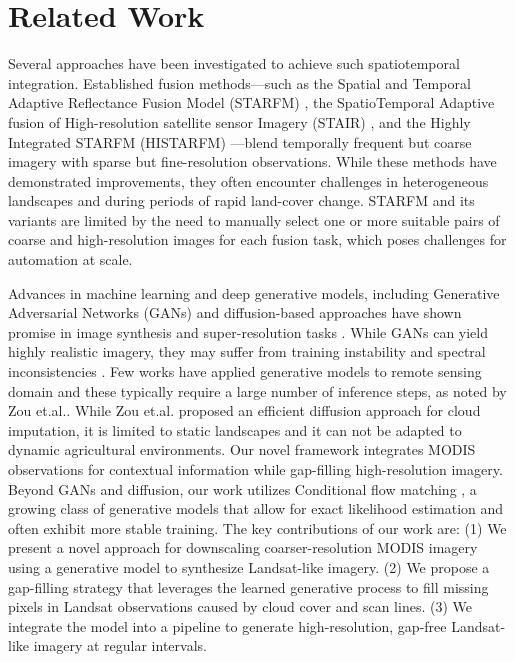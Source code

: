 \section{Related Work}
Several approaches have been investigated to achieve such spatiotemporal integration. Established fusion methods—such as the 
Spatial and Temporal Adaptive Reflectance Fusion Model (STARFM) \cite{gao2006starfm}, the SpatioTemporal Adaptive fusion 
of High-resolution satellite sensor Imagery (STAIR) \cite{zhu2010fusion}, and the Highly Integrated STARFM (HISTARFM) 
\cite{zhu2016histarfm}—blend temporally frequent but coarse imagery with sparse but fine-resolution 
observations. While these methods have demonstrated improvements, they often encounter challenges in heterogeneous landscapes and during periods of rapid land-cover change. STARFM and its variants are limited by the need to manually select one or more suitable pairs of coarse and high-resolution images for each fusion task, which poses challenges for automation at scale.


Advances in machine learning and deep generative models, including Generative Adversarial Networks (GANs) \cite{goodfellow2014generative} and diffusion-based approaches \cite{ho2020denoising} have shown promise in image synthesis and super-resolution tasks  \cite{Wang2019, Lim2017EnhancedDeepSR, Diffusion22}. While GANs can yield highly realistic imagery, they may suffer from training instability and spectral inconsistencies \cite{dhariwal2021diffusion}.
Few works have applied generative models to remote sensing domain \cite{Xiao2024EDiffSR, khanna2024diffusionsat} and these typically require a large number of inference steps, as noted by Zou et.al.. While Zou et.al. proposed an efficient diffusion approach for cloud imputation, it is limited to static landscapes and it can not be adapted to dynamic agricultural environments. Our novel framework integrates MODIS observations for contextual information while gap-filling high-resolution imagery. Beyond GANs and diffusion, our work utilizes Conditional flow matching \cite{Lipman2023Flow,Tong2024Improving}, a growing class of generative models that allow for exact likelihood estimation and often exhibit more stable training. The key contributions of our work are: (1) We present a novel approach for downscaling coarser-resolution MODIS imagery using a generative model to synthesize Landsat-like imagery. (2) We propose a gap-filling strategy that leverages the learned generative process to fill missing pixels in Landsat observations caused by cloud cover and scan lines. (3) We integrate the model into a pipeline to generate high-resolution, gap-free Landsat-like imagery at regular intervals.